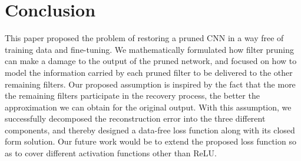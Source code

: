 \section{Conclusion} \label{sec:conclusion}
This paper proposed the problem of restoring a pruned CNN in a way free of training data and fine-tuning. We mathematically formulated how filter pruning can make a damage to the output of the pruned network, and focused on how to model the information carried by each pruned filter to be delivered to the other remaining filters. Our proposed assumption is inspired by the fact that the more the remaining filters participate in the recovery process, the better the approximation we can obtain for the original output. With this assumption, we successfully decomposed the reconstruction error into the three different components, and thereby designed a data-free loss function along with its closed form solution. Our future work would be to extend the proposed loss function so as to cover different activation functions other than ReLU.
